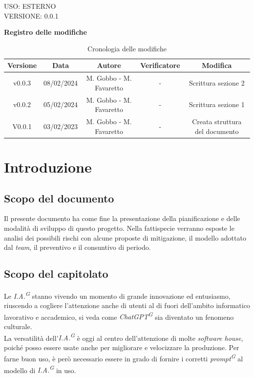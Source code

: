 \documentclass[5pt]{article}
\begin{document}
\begin{flushright}
    \begin{spacing}{1}
        USO: ESTERNO\\
        VERSIONE: 0.0.1\\
    \end{spacing}
\end{flushright}


\restoregeometry

\pagebreak

\textbf{\Large Registro delle modifiche}
\begin{table}[ht]
\centering
\begin{tabular}{|c|c|c|c|c|}
\hline
\textbf{Versione} & \textbf{Data} & \textbf{Autore} & \textbf{Verificatore} & \textbf{Modifica} \\
\hline
v0.0.3 & 08/02/2024 & M. Gobbo - M. Favaretto & - & Scrittura sezione 2 \\
\hline
v0.0.2 & 05/02/2024 & M. Gobbo - M. Favaretto & - & Scrittura sezione 1 \\
\hline
V0.0.1 & 03/02/2023 & M. Gobbo - M. Favaretto & - & Creata struttura del documento \\
\hline
\end{tabular}
\caption{Cronologia delle modifiche}
\label{tab:conference}
\end{table}

\pagebreak
\tableofcontents
\pagebreak

\section{Introduzione}
\subsection{Scopo del documento}
Il presente documento ha come fine la presentazione della pianificazione e delle modalità di sviluppo di questo progetto. 
Nella fattispecie verranno esposte le analisi dei possibili rischi con alcune proposte di mitigazione, il modello adottato dal \textit{team}, 
il preventivo e il consuntivo di periodo.

\subsection{Scopo del capitolato}
Le \textit{I.A.\textsuperscript{G}} stanno vivendo un momento di grande innovazione ed entusiasmo, 
riuscendo a cogliere l'attenzione anche di utenti al di fuori dell'ambito informatico lavorativo e accademico, 
si veda come \textit{ChatGPT\textsuperscript{G}} sia diventato un fenomeno culturale. \\
La versatilità dell'\textit{I.A.\textsuperscript{G}} è oggi al centro dell'attenzione di molte \textit{software house}, 
poiché posso essere usate anche per migliorare e velocizzare la produzione. 
Per farne buon uso, è però necessario essere in grado di fornire i corretti \textit{prompt\textsuperscript{G}} al 
modello di \textit{I.A.\textsuperscript{G}} in uso. \\
\end{document}
